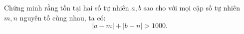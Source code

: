 \ifshowproblem
\begin{problem}\label{example:RUS-2015-TST-D11-P1}
    Chứng minh rằng tồn tại hai số tự nhiên \( a, b \) sao cho với mọi cặp số tự nhiên \( m, n \) nguyên tố cùng nhau, ta có:
    \[
        |a - m| + |b - n| > 1000.
    \]
\end{problem}
\fi

\footnotemark
{}
\fi
